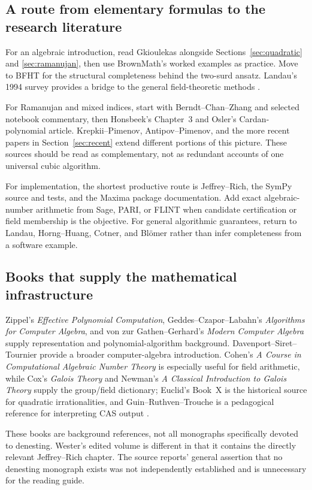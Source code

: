 \documentclass[11pt,oneside]{article}
\numberwithin{equation}{section}
\theoremstyle{definition}
\theoremstyle{remark}
\begin{document}
\subsection{A route from elementary formulas to the research literature}
For an algebraic introduction, read Gkioulekas alongside Sections~\ref{sec:quadratic} and \ref{sec:ramanujan}, then use BrownMath's worked examples as practice. Move to BFHT for the structural completeness behind the two-surd ansatz. Landau's 1994 survey provides a bridge to the general field-theoretic methods \cite{gkioulekas,brownmath,bfht,landau94}.

For Ramanujan and mixed indices, start with Berndt--Chan--Zhang and selected notebook commentary, then Honsbeek's Chapter~3 and Osler's Cardan-polynomial article. Krepkii--Pimenov, Antipov--Pimenov, and the more recent papers in Section~\ref{sec:recent} extend different portions of this picture. These sources should be read as complementary, not as redundant accounts of one universal cubic algorithm.

For implementation, the shortest productive route is Jeffrey--Rich, the SymPy source and tests, and the Maxima package documentation. Add exact algebraic-number arithmetic from Sage, PARI, or FLINT when candidate certification or field membership is the objective. For general algorithmic guarantees, return to Landau, Horng--Huang, Cotner, and Bl\"omer rather than infer completeness from a software example.

\subsection{Books that supply the mathematical infrastructure}
Zippel's \emph{Effective Polynomial Computation}, Geddes--Czapor--Labahn's \emph{Algorithms for Computer Algebra}, and von zur Gathen--Gerhard's \emph{Modern Computer Algebra} supply representation and polynomial-algorithm background. Davenport--Siret--Tournier provide a broader computer-algebra introduction. Cohen's \emph{A Course in Computational Algebraic Number Theory} is especially useful for field arithmetic, while Cox's \emph{Galois Theory} and Newman's \emph{A Classical Introduction to Galois Theory} supply the group/field dictionary; Euclid's Book~X is the historical source for quadratic irrationalities, and Guin--Ruthven--Trouche is a pedagogical reference for interpreting CAS output \cite{zippelbook,geddes,gathen,davenport,cohen,cox,newman,euclid,guin}.

These books are background references, not all monographs specifically devoted to denesting. Wester's edited volume is different in that it contains the directly relevant Jeffrey--Rich chapter. The source reports' general assertion that no denesting monograph exists was not independently established and is unnecessary for the reading guide.
\end{document}
